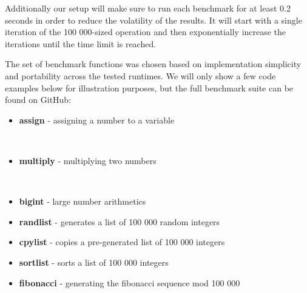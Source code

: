 Additionally our setup will make sure to run each benchmark for at least 0.2 seconds in order to reduce the volatility of the results. It will start with a single iteration of the 100 000-sized operation and then exponentially increase the iterations until the time limit is reached.

The set of benchmark functions was chosen based on implementation simplicity and portability across the tested runtimes. We will only show a few code examples below for illustration purposes, but the full benchmark suite can be found on GitHub:

\begin{itemize}
\tightlist
\item
  \textbf{assign} - assigning a number to a variable
\end{itemize}

\begin{Shaded}
\begin{Highlighting}[]
\OperatorTok{=}\NormalTok{):}
    \NormalTok{ \_ }
\OperatorTok{=} 
\end{Highlighting}
\end{Shaded}

\begin{itemize}
\tightlist
\item
  \textbf{multiply} - multiplying two numbers
\end{itemize}

\begin{Shaded}
\begin{Highlighting}[]
\OperatorTok{=}\NormalTok{):}
    \NormalTok{ \_ }
         \OperatorTok{*} 
\end{Highlighting}
\end{Shaded}

\begin{itemize}
\tightlist
\item
  \textbf{bigint} - large number arithmetics
\item
  \textbf{randlist} - generates a list of 100 000 random integers
\item
  \textbf{cpylist} - copies a pre-generated list of 100 000 integers
\item
  \textbf{sortlist} - sorts a list of 100 000 integers
\item
  \textbf{fibonacci} - generating the fibonacci sequence mod 100 000
\end{itemize}

